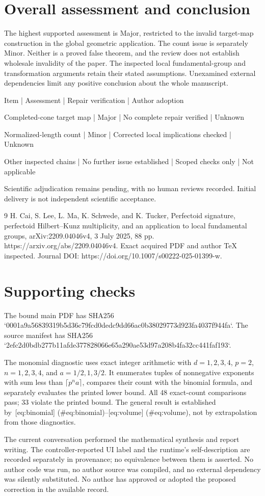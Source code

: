 \documentclass[10pt]{article}
\begin{document}
\section*{Overall assessment and conclusion}
The highest supported assessment is Major, restricted to the invalid target-map construction in the global geometric application. The count issue is separately Minor. Neither is a proved false theorem, and the review does not establish wholesale invalidity of the paper. The inspected local fundamental-group and transformation arguments retain their stated assumptions. Unexamined external dependencies limit any positive conclusion about the whole manuscript.\par
Item | Assessment | Repair verification | Author adoption\par
Completed-cone target map | Major | No complete repair verified | Unknown\par
Normalized-length count | Minor | Corrected local implications checked | Unknown\par
Other inspected chains | No further issue established | Scoped checks only | Not applicable\par
Scientific adjudication remains pending, with no human reviews recorded. Initial delivery is not independent scientific acceptance.\par
9 H. Cai, S. Lee, L. Ma, K. Schwede, and K. Tucker, Perfectoid signature, perfectoid Hilbert–Kunz multiplicity, and an application to local fundamental groups, arXiv:2209.04046v4, 3 July 2025, 88 pp. https://arxiv.org/abs/2209.04046v4. Exact acquired PDF and author TeX inspected. Journal DOI: https://doi.org/10.1007/s00222-025-01399-w.\par
\section*{Supporting checks}
The bound main PDF has SHA256 `0001a9a56839319b5d36c79fcd0dedc9dd66ac0b38029773d923fa4037f944fa`. The source manifest has SHA256 `2efc2d0bdb277b11afde377828066e65a290ae53d97a208b4fa32cc441faf193`.\par
The monomial diagnostic uses exact integer arithmetic with \(d=1,2,3,4\), \(p=2\), \(n=1,2,3,4\), and \(a=1/2,1,3/2\). It enumerates tuples of nonnegative exponents with sum less than \(\lceil p^n a\rceil\), compares their count with the binomial formula, and separately evaluates the printed lower bound. All 48 exact-count comparisons pass; 33 violate the printed bound. The general result is established by [eq:binomial] (\#eq:binomial)–[eq:volume] (\#eq:volume), not by extrapolation from those diagnostics.\par
The current conversation performed the mathematical synthesis and report writing. The controller-reported UI label and the runtime’s self-description are recorded separately in provenance; no equivalence between them is asserted. No author code was run, no author source was compiled, and no external dependency was silently substituted. No author has approved or adopted the proposed correction in the available record.\par
\end{document}
